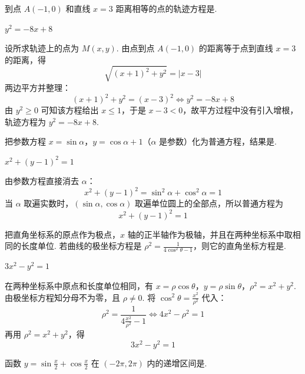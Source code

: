 \documentclass[UTF8,a4paper,oneside,11pt]{ctexbook}
\begin{document}
\begin{problem}
到点 \(A(-1,0)\) 和直线 \(x=3\) 距离相等的点的轨迹方程是\fillinblank{}.
\end{problem}

\begin{answer}
\(y^2=-8x+8\)
\end{answer}

\begin{solution}
设所求轨迹上的点为 \(M(x,y)\). 由点到点 \(A(-1,0)\) 的距离等于点到直线 \(x=3\) 的距离，得
\[
\sqrt{(x+1)^2+y^2}=|x-3|
\]
两边平方并整理：
\[
(x+1)^2+y^2=(x-3)^2
\iff y^2=-8x+8
\]
由 \(y^2\geqslant0\) 可知该方程给出 \(x\leqslant1\)，于是 \(x-3<0\)，故平方过程中没有引入增根，轨迹方程为 \(y^2=-8x+8\).
\end{solution}

\begin{problem}
把参数方程 \(x=\sin\alpha\)，\(y=\cos\alpha+1\)（\(\alpha\) 是参数）化为普通方程，结果是\fillinblank{}.
\end{problem}

\begin{answer}
\(x^2+(y-1)^2=1\)
\end{answer}

\begin{solution}
由参数方程直接消去 \(\alpha\)：
\[
x^2+(y-1)^2=\sin^2\alpha+\cos^2\alpha=1
\]
当 \(\alpha\) 取遍实数时，\((\sin\alpha,\cos\alpha)\) 取遍单位圆上的全部点，所以普通方程为
\[
x^2+(y-1)^2=1
\]
\end{solution}

\begin{problem}
把直角坐标系的原点作为极点，\(x\) 轴的正半轴作为极轴，并且在两种坐标系中取相同的长度单位. 若曲线的极坐标方程是 \(\rho^2=\frac{1}{4\cos^2\theta-1}\)，则它的直角坐标方程是\fillinblank{}.
\end{problem}

\begin{answer}
\(3x^2-y^2=1\)
\end{answer}

\begin{solution}
在两种坐标系中原点和长度单位相同，有
\(x=\rho\cos\theta\)，\(y=\rho\sin\theta\)，\(\rho^2=x^2+y^2\).
由极坐标方程知分母不为零，且 \(\rho\ne0\). 将 \(\cos^2\theta=\frac{x^2}{\rho^2}\) 代入：
\[
\rho^2=\frac{1}{4\frac{x^2}{\rho^2}-1}
\iff 4x^2-\rho^2=1
\]
再用 \(\rho^2=x^2+y^2\)，得
\[
3x^2-y^2=1
\]
\end{solution}

\begin{problem}
函数 \(y=\sin\frac{x}{2}+\cos\frac{x}{2}\) 在 \((-2\pi,2\pi)\) 内的递增区间是\fillinblank{}.
\end{problem}
\end{document}
